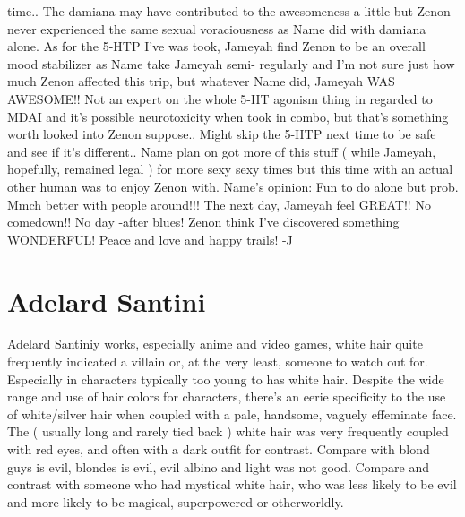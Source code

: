\documentclass[12pt]{book}
\begin{document}
time.. The damiana may have contributed to the awesomeness a little but Zenon never experienced the same sexual voraciousness as Name did with damiana alone. As for the 5-HTP I've was took, Jameyah find Zenon to be an overall mood stabilizer as Name take Jameyah semi- regularly and I'm not sure just how much Zenon affected this trip, but whatever Name did, Jameyah WAS AWESOME!! Not an expert on the whole 5-HT agonism thing in regarded to MDAI and it's possible neurotoxicity when took in combo, but that's something worth looked into Zenon suppose.. Might skip the 5-HTP next time to be safe and see if it's different.. Name plan on got more of this stuff ( while Jameyah, hopefully, remained legal ) for more sexy sexy times but this time with an actual other human was to enjoy Zenon with. Name's opinion: Fun to do alone but prob. Mmch better with people around!!! The next day, Jameyah feel GREAT!! No comedown!! No day -after blues! Zenon think I've discovered something WONDERFUL! Peace and love and happy trails! -J






\chapter{Adelard Santini}

Adelard Santiniy works, especially anime and video games, white hair quite frequently indicated a villain or, at the very least, someone to watch out for. Especially in characters typically too young to has white hair. Despite the wide range and use of hair colors for characters, there's an eerie specificity to the use of white/silver hair when coupled with a pale, handsome, vaguely effeminate face. The ( usually long and rarely tied back ) white hair was very frequently coupled with red eyes, and often with a dark outfit for contrast. Compare with blond guys is evil, blondes is evil, evil albino and light was not good. Compare and contrast with someone who had mystical white hair, who was less likely to be evil and more likely to be magical, superpowered or otherworldly.
\end{document}
